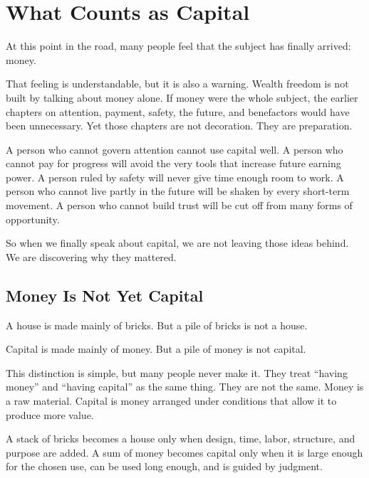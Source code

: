 \chapter{What Counts as Capital}

At this point in the road, many people feel that the subject has finally arrived: money.

That feeling is understandable, but it is also a warning. Wealth freedom is not built by talking about money alone. If money were the whole subject, the earlier chapters on attention, payment, safety, the future, and benefactors would have been unnecessary. Yet those chapters are not decoration. They are preparation.

A person who cannot govern attention cannot use capital well. A person who cannot pay for progress will avoid the very tools that increase future earning power. A person ruled by safety will never give time enough room to work. A person who cannot live partly in the future will be shaken by every short-term movement. A person who cannot build trust will be cut off from many forms of opportunity.

So when we finally speak about capital, we are not leaving those ideas behind. We are discovering why they mattered.

\section*{Money Is Not Yet Capital}

A house is made mainly of bricks. But a pile of bricks is not a house.

Capital is made mainly of money. But a pile of money is not capital.

This distinction is simple, but many people never make it. They treat ``having money'' and ``having capital'' as the same thing. They are not the same. Money is a raw material. Capital is money arranged under conditions that allow it to produce more value.

A stack of bricks becomes a house only when design, time, labor, structure, and purpose are added. A sum of money becomes capital only when it is large enough for the chosen use, can be used long enough, and is guided by judgment.

